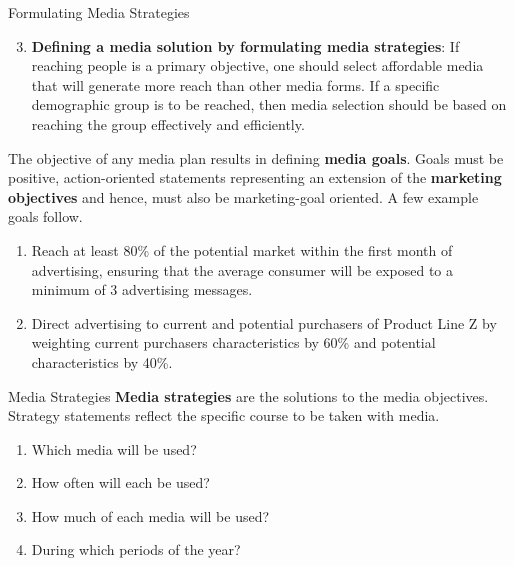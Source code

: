 \documentclass[pdf]{beamer}
\newcommand{\empr}[1]{{\color{franklinblue}\textbf{#1}}}
\theoremstyle{remark}
\theoremstyle{definition}
\begin{document}
\begin{frame}[t]{Formulating Media Strategies}
\small
\begin{enumerate}
  \setcounter{enumi}{2}
   \item  \textbf{Defining a media solution by formulating media strategies}:  If reaching people is a primary objective, one should select affordable media that will generate more reach than other media forms.  If a specific demographic group is to be reached, then media selection should be based on reaching the group effectively and efficiently. 
\end{enumerate}
\vspace{-0.5ex}
\normalsize
The objective of any media plan results in defining \empr{media goals}.  Goals must be positive, action-oriented statements representing an extension of the \empr{marketing objectives} and hence, must also be marketing-goal oriented. A few example goals follow. \\
\vspace{0.5ex}
\small
\begin{enumerate}
  \item Reach at least 80\% of the potential market within the first month of advertising, ensuring that the average consumer will be exposed to a minimum of 3 advertising messages.
  \item Direct advertising to current and potential purchasers of Product Line Z by weighting current purchasers characteristics by 60\% and potential characteristics by 40\%.
\end{enumerate}
\end{frame}

\begin{frame}[t]{Media Strategies}
\empr{Media strategies} are the solutions to the media objectives.  Strategy statements reflect the specific course to be taken with media. \\ 
\vspace{1.5ex}
\begin{enumerate}
  \item Which media will be used?
  \item How often will each be used?
  \item How much of each media will be used?
  \item During which periods of the year? 
\end{enumerate}
\end{frame}
\end{document}
